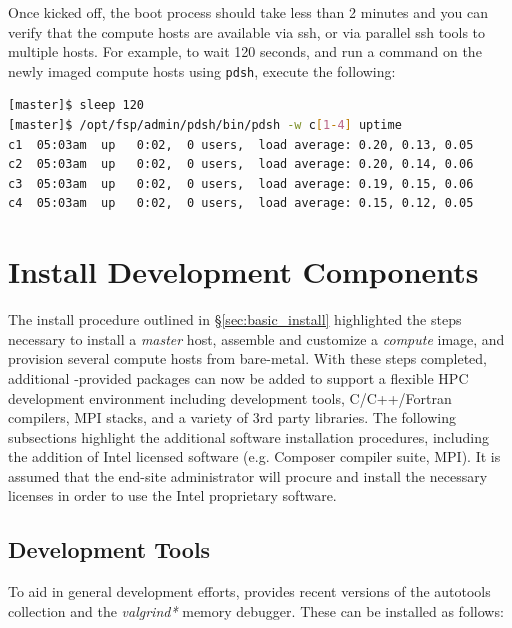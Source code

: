 \documentclass[letterpaper]{article}
\begin{document}

Once kicked off, the boot process should take less than 2 minutes and you can
verify that the compute hosts are available via ssh, or via parallel ssh tools to multiple
hosts. For example, to wait 120 seconds, and run a command on the newly imaged
compute hosts using \texttt{pdsh}, execute the following:

\begin{lstlisting}[language=bash]
[master]$ sleep 120
[master]$ /opt/fsp/admin/pdsh/bin/pdsh -w c[1-4] uptime
c1  05:03am  up   0:02,  0 users,  load average: 0.20, 0.13, 0.05
c2  05:03am  up   0:02,  0 users,  load average: 0.20, 0.14, 0.06
c3  05:03am  up   0:02,  0 users,  load average: 0.19, 0.15, 0.06
c4  05:03am  up   0:02,  0 users,  load average: 0.15, 0.12, 0.05
\end{lstlisting}



\section{Install \FSP{} Development Components}

The install procedure outlined in \S\ref{sec:basic_install}
highlighted the steps necessary to install a {\em master} host,
assemble and customize a {\em compute} image, and provision several
compute hosts from bare-metal.  With these steps completed, 
additional \FSP{}-provided packages can now be added to support a flexible HPC
development environment including development tools, C/C++/Fortran compilers,
MPI stacks, and a variety of 3rd party libraries. The following subsections
highlight the additional software installation procedures, including the
addition of Intel licensed software (e.g. Composer compiler suite, \Intel{}
MPI). It is assumed that the end-site administrator will procure and install
the necessary licenses in order to use the Intel proprietary software.

\subsection{Development Tools}

To aid in general development efforts, \FSP{} provides recent versions of the \GNU{}
autotools collection and the {\em valgrind*} memory debugger. These can be installed as follows:
\end{document}
